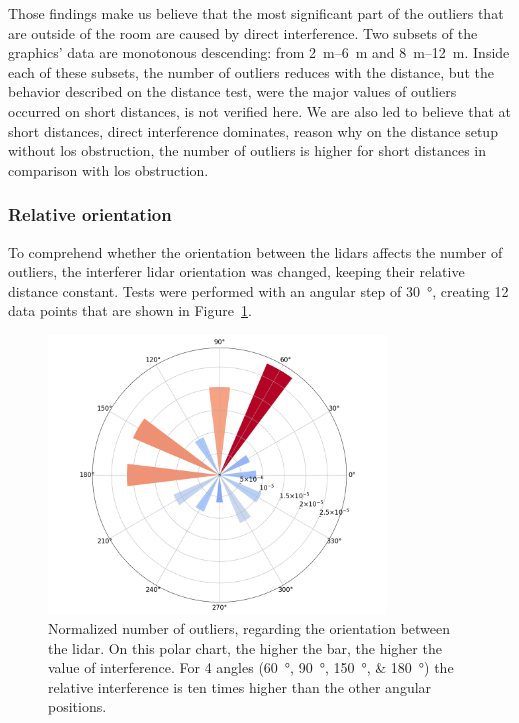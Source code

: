Those findings make us believe that the most significant part of the outliers that are outside of the room are caused by direct interference. Two subsets of the graphics' data are monotonous descending: from \SIrange{2}{6}{\meter} and \SIrange{8}{12}{\meter}. Inside each of these subsets, the number of outliers reduces with the distance, but the behavior described on the distance test, were the major values of outliers occurred on short distances, is not verified here. We are also led to believe that at short distances, direct interference dominates, reason why on the distance setup without \ac{los} obstruction, the number of outliers is higher for short distances in comparison with \ac{los} obstruction.

\subsubsection{Relative orientation}
To comprehend whether the orientation between the \acp{lidar} affects the number of outliers, the interferer \ac{lidar} orientation was changed, keeping their relative distance constant. Tests were performed with an angular step of \SI{30}{\degree}, creating 12 data points that are shown in Figure~\ref{fig:box-filter-outliers-direction}.

\begin{figure}[!ht]
\centering
\includegraphics[width=0.8\textwidth]{img/lidar-interference/box-filtering/interference-box-filter-outliers-direction.png}
\caption[Relative number of outliers when the relative orientation between the \acsp{lidar} is varied on \acs{irislab}.]{Normalized number of outliers, regarding the orientation between the \ac{lidar}. On this polar chart, the higher the bar, the higher the value of interference. For 4 angles (\SIlist[list-final-separator = {, }]{60; 90; 150; 180}{\degree}) the relative interference is ten times higher than the other angular positions.}
\label{fig:box-filter-outliers-direction}
\end{figure}

